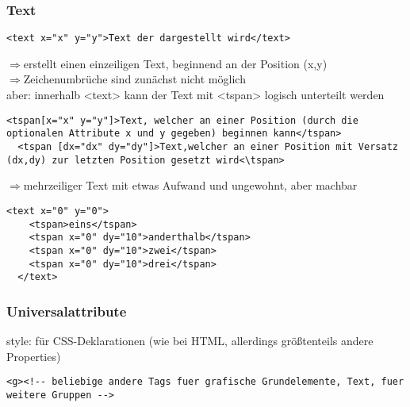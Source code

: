\subsubsection{Text}
\begin{lstlisting}[caption={Syntax des Text-Tag}, label={lst:text-Tag}, language={SVG}]
  <text x="x" y="y">Text der dargestellt wird</text>
\end{lstlisting}
$\Rightarrow$erstellt einen einzeiligen Text, beginnend an der Position (x,y)\\
$\Rightarrow$Zeichenumbrüche sind zunächst nicht möglich\\
aber: innerhalb <text> kann der Text mit <tspan> logisch unterteilt werden
\begin{lstlisting}[caption={Syntax des Text-Tag}, label={lst:Syntax des tspan-Tag}, language={SVG}]
  <tspan[x="x" y="y"]>Text, welcher an einer Position (durch die optionalen Attribute x und y gegeben) beginnen kann</tspan>
  <tspan [dx="dx" dy="dy"]>Text,welcher an einer Position mit Versatz (dx,dy) zur letzten Position gesetzt wird<\tspan>
\end{lstlisting}
$\Rightarrow$mehrzeiliger Text mit etwas Aufwand und ungewohnt, aber machbar\\
\begin{lstlisting}[caption={Beispiel für ein tspan-Tag}, label={lst:text-Tag}, language={SVG}]
  <text x="0" y="0">
    <tspan>eins</tspan>
    <tspan x="0" dy="10">anderthalb</tspan>
    <tspan x="0" dy="10">zwei</tspan>
    <tspan x="0" dy="10">drei</tspan>
  </text>
\end{lstlisting}
\subsubsection{Universalattribute}
style: für CSS-Deklarationen (wie bei HTML, allerdings größtenteils andere Properties)\\
\begin{lstlisting}[caption={Gruppierung von Inhalts-Tags bei SVG}, label={lst:text-Tag}, language={SVG}]
  <g><!-- beliebige andere Tags fuer grafische Grundelemente, Text, fuer weitere Gruppen -->
\end{lstlisting}

